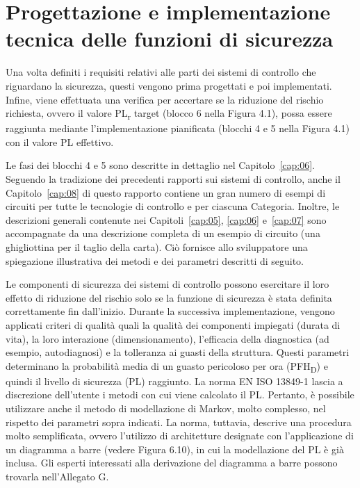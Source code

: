 \section{Progettazione e implementazione tecnica delle funzioni di sicurezza}
\label{sec:04-2}
Una volta definiti i requisiti relativi alle parti dei sistemi di controllo che riguardano la sicurezza, questi vengono prima progettati e poi implementati. Infine, viene effettuata una verifica per accertare se la riduzione del rischio richiesta, ovvero il valore PL\textsubscript{\small r} target (blocco 6 nella Figura 4.1), possa essere raggiunta mediante l'implementazione pianificata (blocchi 4 e 5 nella Figura 4.1) con il valore PL effettivo.

Le fasi dei blocchi 4 e 5 sono descritte in dettaglio nel Capitolo~\ref{cap:06}. Seguendo la tradizione dei precedenti rapporti sui sistemi di controllo, anche il Capitolo~\ref{cap:08} di questo rapporto contiene un gran numero di esempi di circuiti per tutte le tecnologie di controllo e per ciascuna Categoria. Inoltre, le descrizioni generali contenute nei Capitoli~\ref{cap:05}, \ref{cap:06} e~\ref{cap:07} sono accompagnate da una descrizione completa di un esempio di circuito (una ghigliottina per il taglio della carta). Ciò fornisce allo sviluppatore una spiegazione illustrativa dei metodi e dei parametri descritti di seguito.

Le componenti di sicurezza dei sistemi di controllo possono esercitare il loro effetto di riduzione del rischio solo se la funzione di sicurezza è stata definita correttamente fin dall'inizio. Durante la successiva implementazione, vengono applicati criteri di qualità quali la qualità dei componenti impiegati (durata di vita), la loro interazione (dimensionamento), l'efficacia della diagnostica (ad esempio, autodiagnosi) e la tolleranza ai guasti della struttura. Questi parametri determinano la probabilità media di un guasto pericoloso per ora (PFH\textsubscript{D}) e quindi il livello di sicurezza (PL) raggiunto. La norma EN ISO 13849-1 lascia a discrezione dell'utente i metodi con cui viene calcolato il PL. Pertanto, è possibile utilizzare anche il metodo di modellazione di Markov, molto complesso, nel rispetto dei parametri sopra indicati. La norma, tuttavia, descrive una procedura molto semplificata, ovvero l'utilizzo di architetture designate con l'applicazione di un diagramma a barre (vedere Figura 6.10), in cui la modellazione del PL è già inclusa.
Gli esperti interessati alla derivazione del diagramma a barre possono trovarla nell'Allegato G.

